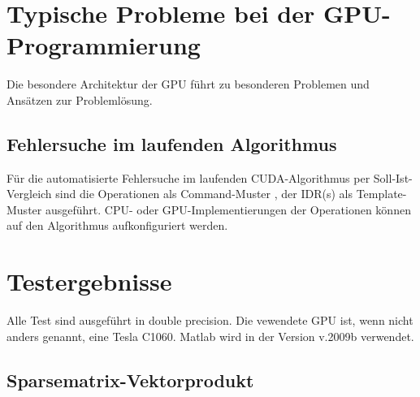 \documentclass[journal]{IEEEtran}
\begin{document}



\section{Typische Probleme bei der GPU-Programmierung}


Die besondere Architektur der GPU führt zu besonderen Problemen
und Ansätzen zur Problemlösung.






%

\subsection{Fehlersuche im laufenden Algorithmus}


Für die automatisierte Fehlersuche im laufenden CUDA-Algorithmus per Soll-Ist-Vergleich
sind die Operationen als Command-Muster \cite{entwurfsmuster},
der IDR(s) als Template-Muster \cite{entwurfsmuster} ausgeführt. CPU- oder
GPU-Implementierungen der Operationen können auf den Algorithmus aufkonfiguriert werden.




\section{Testergebnisse}

Alle Test sind ausgeführt in double precision.
Die vewendete GPU ist, wenn nicht anders genannt, eine Tesla C1060.
Matlab wird in der Version v.2009b verwendet.

\subsection{Sparsematrix-Vektorprodukt}
\end{document}
